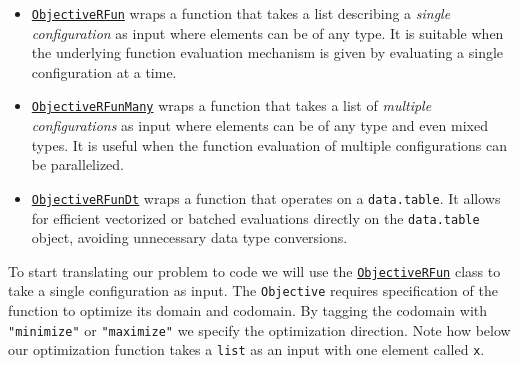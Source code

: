 \begin{itemize}
\tightlist
\item
  \href{https://bbotk.mlr-org.com/reference/ObjectiveRFun.html}{\texttt{ObjectiveRFun}}
  wraps a function that takes a list describing a \emph{single
  configuration} as input where elements can be of any type. It is
  suitable when the underlying function evaluation mechanism is given by
  evaluating a single configuration at a time.
\item
  \href{https://bbotk.mlr-org.com/reference/ObjectiveRFunMany.html}{\texttt{ObjectiveRFunMany}}
  wraps a function that takes a list of \emph{multiple configurations}
  as input where elements can be of any type and even mixed types. It is
  useful when the function evaluation of multiple configurations can be
  parallelized.
\item
  \href{https://bbotk.mlr-org.com/reference/ObjectiveRFunDt.html}{\texttt{ObjectiveRFunDt}}
  wraps a function that operates on a \texttt{data.table}. It allows for
  efficient vectorized or batched evaluations directly on the
  \texttt{data.table} object, avoiding unnecessary data type
  conversions.
\end{itemize}

To start translating our problem to code we will use the
\href{https://bbotk.mlr-org.com/reference/ObjectiveRFun.html}{\texttt{ObjectiveRFun}}
class to take a single configuration as input. The \texttt{Objective}
requires specification of the function to optimize its domain and
codomain. By tagging the codomain with \texttt{"minimize"} or
\texttt{"maximize"} we specify the optimization direction. Note how
below our optimization function takes a \texttt{list} as an input with
one element called \texttt{x}.

\begin{Shaded}
\begin{Highlighting}[]
\OtherTok{=}  \SpecialCharTok{*}\SpecialCharTok{$}\SpecialCharTok{*} \NormalTok{(} \SpecialCharTok{*}\SpecialCharTok{$}

\OtherTok{=} \NormalTok{(} \NormalTok{(} \NormalTok{, } \NormalTok{))}
\OtherTok{=} \NormalTok{(} \NormalTok{(} \NormalTok{))}
\OtherTok{=}\SpecialCharTok{$}
\end{Highlighting}
\end{Shaded}

